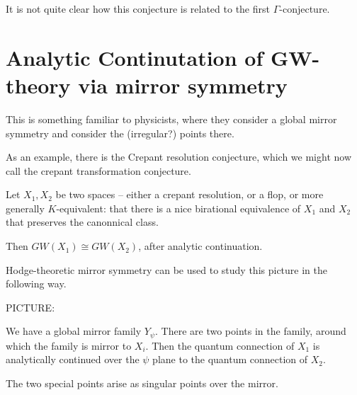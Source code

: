 \documentclass{amsart}
\theoremstyle{definition}
\begin{document}
It is not quite clear how this conjecture is related to the first $\Gamma$-conjecture.

\section{Analytic Continutation of GW-theory via mirror symmetry}

This is something familiar to physicists, where they consider a global mirror symmetry and consider the (irregular?) points there.

As an example, there is the Crepant resolution conjecture, which we might now call the crepant transformation conjecture.  

Let $X_1, X_2$ be two spaces -- either a crepant resolution, or a flop, or more generally $K$-equivalent: that there is a nice birational equivalence of $X_1$ and $X_2$ that preserves the canonnical class.

Then $GW(X_1)\cong GW(X_2)$, after analytic continuation.

Hodge-theoretic mirror symmetry can be used to study this picture in the following way.

PICTURE:

We have a global mirror family $Y_\psi$.  There are two points in the family, around which the family is mirror to $X_i$.  Then the quantum connection of $X_1$ is analytically continued over the $\psi$ plane to the quantum connection of $X_2$.  

The two special points arise as singular points over the mirror.
\end{document}
